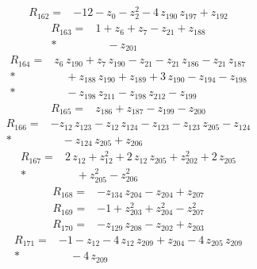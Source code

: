 \documentclass[10pt]{article}
\begin{document}
\begin{align*}
R_{162}={}& - 12 - z_{0} - z_{2}^{2} - 4\,z_{190}\,z_{197} + z_{192}
\end{align*}
\begin{align*}
R_{163}={}& 1 + z_{6} + z_{7} - z_{21} + z_{188} \\*
&\quad - z_{201}
\end{align*}
\begin{align*}
R_{164}={}& z_{6}\,z_{190} + z_{7}\,z_{190} - z_{21} - z_{21}\,z_{186} - z_{21}\,z_{187} \\*
&\quad + z_{188}\,z_{190} + z_{189} + 3\,z_{190} - z_{194} - z_{198} \\*
&\quad - z_{198}\,z_{211} - z_{198}\,z_{212} - z_{199}
\end{align*}
\begin{align*}
R_{165}={}& z_{186} + z_{187} - z_{199} - z_{200}
\end{align*}
\begin{align*}
R_{166}={}& - z_{12}\,z_{123} - z_{12}\,z_{124} - z_{123} - z_{123}\,z_{205} - z_{124} \\*
&\quad - z_{124}\,z_{205} + z_{206}
\end{align*}
\begin{align*}
R_{167}={}& 2\,z_{12} + z_{12}^{2} + 2\,z_{12}\,z_{205} + z_{202}^{2} + 2\,z_{205} \\*
&\quad + z_{205}^{2} - z_{206}^{2}
\end{align*}
\begin{align*}
R_{168}={}& - z_{134}\,z_{204} - z_{204} + z_{207}
\end{align*}
\begin{align*}
R_{169}={}& - 1 + z_{203}^{2} + z_{204}^{2} - z_{207}^{2}
\end{align*}
\begin{align*}
R_{170}={}& - z_{129}\,z_{208} - z_{202} + z_{203}
\end{align*}
\begin{align*}
R_{171}={}& - 1 - z_{12} - 4\,z_{12}\,z_{209} + z_{204} - 4\,z_{205}\,z_{209} \\*
&\quad - 4\,z_{209}
\end{align*}
\end{document}
